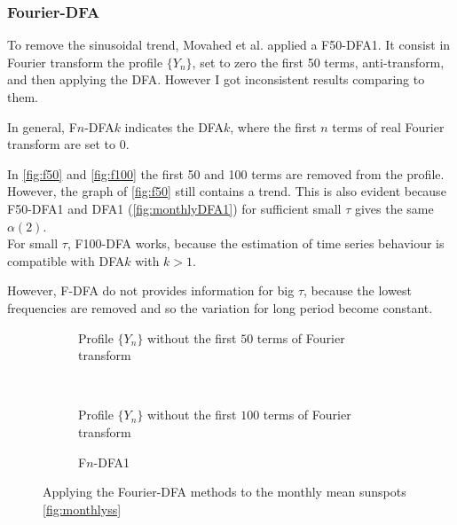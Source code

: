 \subsubsection*{Fourier-DFA}
To remove the sinusoidal trend, Movahed et al. applied a F50-DFA1. It consist in Fourier transform the profile $\{ Y_n \}$, set to zero the first 50 terms, anti-transform, and then applying the DFA. However I got inconsistent results comparing to them.

In general, F$n$-DFA$k$ indicates the DFA$k$, where the first $n$ terms of real Fourier transform are set to 0.  

In \autoref{fig:f50} and \autoref{fig:f100} the first 50 and 100 terms are removed from the profile. However, the graph of \autoref{fig:f50} still contains a trend. This is also evident because F50-DFA1 and DFA1 (\autoref{fig:monthlyDFA1}) for sufficient small $\tau$ gives the same $\alpha(2)$.\\
For small $\tau$, F100-DFA works, because the estimation of time series behaviour is compatible with DFA$k$ with $k>1$.

However, F-DFA do not provides information for big $\tau$, because the lowest frequencies are removed and so the variation for long period become constant. 

\begin{figure}[!h]
	\centering
	\begin{subfigure}{0.48\textwidth}
		
		\caption{Profile $\{Y_n\}$ without the first $50$ terms of Fourier transform}\label{fig:f50}
	\end{subfigure}
	~
	\begin{subfigure}{0.48\textwidth}
		
		\caption{Profile $\{Y_n\}$ without the first $100$ terms of Fourier transform}\label{fig:f100}
	\end{subfigure}
	
	\begin{subfigure}{\textwidth}
		
		\caption{F$n$-DFA1\\}
	\end{subfigure}
	\caption{Applying the Fourier-DFA methods to the monthly mean sunspots \ref{fig:monthlyss}}\label{fig:fdfa}
\end{figure}
